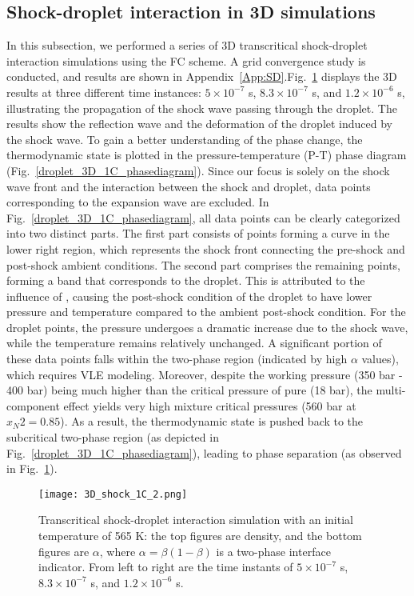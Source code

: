 \subsection{Shock-droplet interaction in 3D simulations}
\label{sec:SD_3D}

In this subsection, we performed a series of 3D transcritical shock-droplet interaction simulations using the FC scheme. A grid convergence study is conducted, and results are shown in Appendix~\ref{App:SD}.Fig.~\ref{droplet_3d_1C} displays the 3D results at three different time instances: $5\times 10^{-7}$ s, $8.3\times 10^{-7}$ s, and $1.2\times 10^{-6}$ s, illustrating the propagation of the shock wave passing through the droplet. The results show the reflection wave and the deformation of the droplet induced by the shock wave. To gain a better understanding of the phase change, the thermodynamic state is plotted in the pressure-temperature (P-T) phase diagram (Fig.~\ref{droplet_3D_1C_phasediagram}). Since our focus is solely on the shock wave front and the interaction between the shock and droplet, data points corresponding to the expansion wave are excluded. In Fig.~\ref{droplet_3D_1C_phasediagram}, all data points can be clearly categorized into two distinct parts. The first part consists of points forming a curve in the lower right region, which represents the shock front connecting the pre-shock and post-shock ambient conditions. The second part comprises the remaining points, forming a band that corresponds to the droplet. This is attributed to the influence of , causing the post-shock condition of the droplet to have lower pressure and temperature compared to the ambient post-shock condition. For the droplet points, the pressure undergoes a dramatic increase due to the shock wave, while the temperature remains relatively unchanged. A significant portion of these data points falls within the two-phase region (indicated by high $\alpha$ values), which requires VLE modeling. Moreover, despite the working pressure (350 bar - 400 bar) being much higher than the critical pressure of pure  (18 bar), the multi-component effect yields very high mixture critical pressures (560 bar at $x_N2 = 0.85$). As a result, the thermodynamic state is pushed back to the subcritical two-phase region (as depicted in Fig.~\ref{droplet_3D_1C_phasediagram}), leading to phase separation (as observed in Fig.~\ref{droplet_3d_1C}).

\begin{figure}[htbp]
\centering
\texttt{[image: 3D\_shock\_1C\_2.png]}
\caption{Transcritical shock-droplet interaction simulation with an initial temperature of 565 K: the top figures are density, and the bottom figures are $\alpha$, where $\alpha = \beta (1-\beta)$ is a two-phase interface indicator. From left to right are the time instants of $5\times 10^{-7}$ s, $8.3\times 10^{-7}$ s, and $1.2\times 10^{-6}$ s. }
\label{droplet_3d_1C} 
\end{figure}

